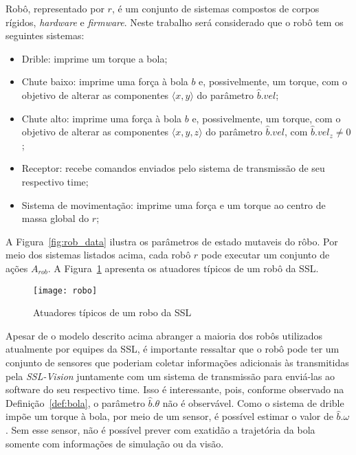 \begin{defi}[Robô]
  Robô, representado por $r$, é um conjunto de sistemas compostos
  de corpos rígidos, \textit{hardware} e \textit{firmware}. Neste
  trabalho será considerado que o robô tem os seguintes sistemas:

  \begin{itemize}
    \item Drible: imprime um torque a bola;
    \item Chute baixo: imprime uma força à bola $b$
          e, possivelmente, um torque, com o objetivo de
          alterar as componentes $\langle x,y \rangle$
          do parâmetro $\hat{b}.vel$;
    \item Chute alto: imprime uma força à bola $b$
          e, possivelmente, um torque, com o objetivo de
          alterar as componentes $\langle x,y,z \rangle$
          do parâmetro $\hat{b}.vel$, com $\hat{b}.vel_z \neq 0$;
    \item Receptor: recebe comandos enviados pelo sistema de
          transmissão de seu respectivo time;
    \item Sistema de movimentação: imprime uma força e um torque
          ao centro de massa global do $r$;
  \end{itemize}
\end{defi}

  A Figura~\ref{fig:rob_data} ilustra os parâmetros de estado mutaveis
  do rôbo. Por meio dos sistemas listados acima, cada robô $r$ pode
  executar um conjunto de ações $A_{rob}$. A Figura~\ref{fig:robo}
  apresenta os atuadores típicos de um robô da SSL.

  \begin{figure}[H]
    \centering
    \texttt{[image: robo]}
    \caption{Atuadores típicos de um robo da SSL}\label{fig:robo}
  \end{figure}

  Apesar de o modelo descrito acima abranger a maioria dos
  robôs utilizados atualmente por equipes da SSL, é importante
  ressaltar que o robô pode ter um conjunto de sensores que
  poderiam coletar informações adicionais às transmitidas pela
  \textit{SSL-Vision} juntamente com um sistema de transmissão
  para enviá-las ao software do seu respectivo time. Isso é
  interessante, pois, conforme observado na Definição~\ref{def:bola},
  o parâmetro $\hat{b}.\theta$ não é observável. Como o sistema de
  drible impõe um torque à bola, por meio de um sensor, é possível
  estimar o valor de $\hat{b}.\omega$. Sem esse sensor, não é possível
  prever com exatidão a trajetória da bola somente com informações de
  simulação ou da visão.


